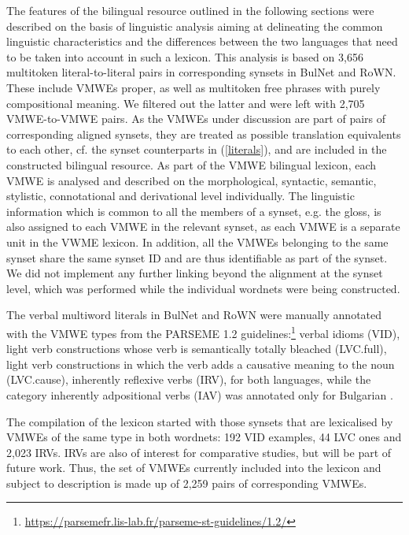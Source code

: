\documentclass[output=paper,colorlinks,citecolor=brown]{langscibook}
\begin{document}
The features of the bilingual resource outlined in the following sections were described on the basis of linguistic analysis aiming at delineating the common linguistic characteristics and the differences between the two languages that need to be taken into account in such a lexicon. This analysis is based on 3,656 multitoken literal-to-literal pairs in corresponding synsets in BulNet and RoWN. These include VMWEs proper, as well as multitoken free phrases with purely compositional meaning. We filtered out the latter and were left with 2,705 VMWE-to-VMWE pairs. As the VMWEs under discussion are part of pairs of corresponding aligned synsets, they are treated as possible translation equivalents to each other, cf. the synset counterparts in (\ref{literals}), and are included in the constructed bilingual resource. As part of the VMWE bilingual lexicon, each VMWE is analysed and described on the morphological, syntactic, semantic, stylistic, connotational and derivational level individually. The linguistic information which is common to all the members of a synset, e.g. the gloss, is also assigned to each VMWE in the relevant synset, as each VMWE is a separate unit in the VWME lexicon. In addition, all the VMWEs belonging to the same synset share the same synset ID and are thus identifiable as part of the synset. We did not implement any further linking beyond the alignment at the synset level, which was performed while the individual wordnets were being constructed.      

\begin{sloppypar}
The verbal multiword literals in BulNet and RoWN were manually annotated with the VMWE types from the PARSEME 1.2 guidelines:\footnote{\url{https://parsemefr.lis-lab.fr/parseme-st-guidelines/1.2/}} verbal idioms (VID), light verb constructions whose verb is semantically totally bleached (LVC.full), light verb constructions in which the verb adds a causative meaning to the noun (LVC.cause), inherently reflexive verbs (IRV), for both languages, while the category inherently adpositional verbs (IAV) was annotated only for Bulgarian \citep{barbu-mititelu-etal-2019-hear}. 
\end{sloppypar}

The compilation of the lexicon started with those synsets that are lexicalised by VMWEs of the same type in both wordnets: 192 VID examples, 44 LVC ones and 2,023 IRVs. IRVs are also of interest for comparative studies, but will be part of future work. Thus, the set of VMWEs currently included into the lexicon and subject to description is made up of 2,259 pairs of corresponding VMWEs.%
\end{document}
